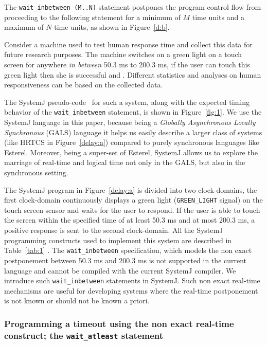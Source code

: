 The \texttt{wait\_inbetween (M..N)} statement postpones the program
control flow from proceeding to the following statement for a minimum of
$M$ time units and a maximum of $N$ time units, as shown in
Figure~\ref{d:b}.

Consider a machine used to test human response time and collect this
data for future research purposes. The machine switches on a green light
on a touch screen for anywhere \textit{in between} 50.3 ms to 200.3 ms,
if the user can touch this green light then she is successful and . Different statistics and analyses on human
responsiveness can be based on the collected data.

The SystemJ pseudo-code~\cite{amal10} for such a system, along with the
expected timing behavior of the \texttt{wait\-\_inbetween} statement, is
shown in Figure~\ref{fig:1}. We use the SystemJ language in this paper,
because being a \textit{Globally Asynchronous Locally Synchronous}
(GALS) language it helps us easily describe a larger class of systems
(like HRTCS in Figure~\ref{delay:a}) compared to purely synchronous
languages like Esterel. Moreover, being a super-set of Esterel, SystemJ
allows us to explore the marriage of real-time and logical time not only
in the GALS, but also in the synchronous setting.

The SystemJ program in Figure~\ref{delay:a} is divided into two
 clock-domains, the first clock-domain
continuously displays a green light (\texttt{GREEN\_LIGHT} signal) on
the touch screen sensor and waits for the user to respond. If the user
is able to touch the screen within the specified time of at least 50.3
ms and at most 200.3 ms, a positive response is sent to the second
clock-domain. All the SystemJ programming constructs used to implement
this system are described in Table~\ref{tab:1} . The \texttt{wait\_inbetween}
specification, which models the non exact postponement between 50.3 ms
and 200.3 ms is not supported in the current language and cannot be
compiled with the current SystemJ compiler. We introduce such
\texttt{wait\_inbetween} statements in SystemJ. Such non exact real-time
mechanisms are useful for developing systems where the real-time
postponement is not known or should not be known a priori.

\subsubsection{Programming a timeout using the non exact real-time
  construct; the \texttt{wait\_atleast} statement}
\label{sec:progr-time-using}

